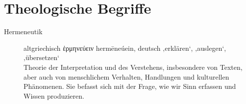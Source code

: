 \documentclass{../inc/mybib}
\begin{document}
    \section{Theologische Begriffe}
    \begin{description}
        \item[Hermeneutik] altgriechisch \textgreek{ἑρμηνεύειν} hermēneúein, deutsch ‚erklären‘, ‚auslegen‘, ‚übersetzen‘\\
        Theorie der Interpretation und des Verstehens, insbesondere von Texten, aber auch von menschlichem Verhalten, Handlungen und kulturellen Phänomenen. Sie befasst sich mit der Frage, wie wir Sinn erfassen und Wissen produzieren. 
    \end{description}
\end{document}
